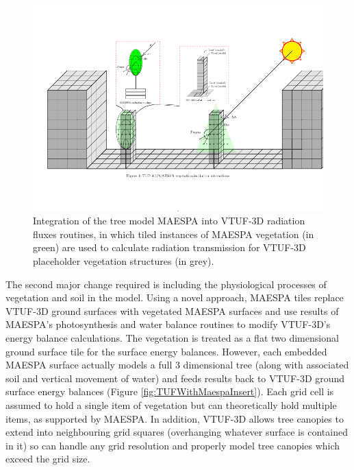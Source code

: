 \documentclass[final,3p,times,authoryear]{elsarticle}
\begin{document}
\begin{figure}[!htbp]
 \includegraphics[trim = 15mm 41mm 0mm 31mm, clip, scale=0.45]{images/TUFWithMaespaVegRadiation.png}  
 \caption{Integration of the tree model MAESPA into VTUF-3D radiation fluxes routines, in which tiled instances of MAESPA vegetation (in green) are used to calculate radiation transmission for VTUF-3D placeholder vegetation structures (in grey)\label{fig:TUFWithMaespaVegRadiation}.}
\end{figure}

The second major change required is including the physiological processes of vegetation and soil in the model. Using a novel approach, MAESPA tiles replace VTUF-3D ground surfaces with vegetated MAESPA surfaces and use results of MAESPA's photosynthesis and water balance routines to modify VTUF-3D's energy balance calculations. The vegetation is treated as a flat two dimensional ground surface tile for the surface energy balances. However, each embedded MAESPA surface actually models a full 3 dimensional tree (along with associated soil and vertical movement of water) and feeds results back to VTUF-3D ground surface energy balances (Figure \ref{fig:TUFWithMaespaInsert}). Each grid cell is assumed to hold a single item of vegetation but can theoretically hold multiple items, as supported by MAESPA. In addition, VTUF-3D allows tree canopies to extend into neighbouring grid squares (overhanging whatever surface is contained in it) so can handle any grid resolution and properly model tree canopies which exceed the grid size.  
\end{document}
